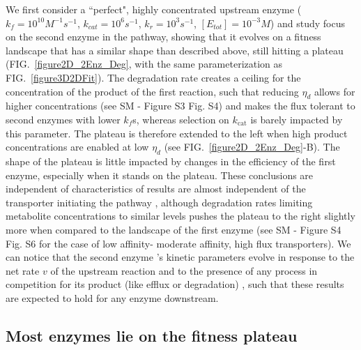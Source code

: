 \documentclass[11pt,onecolumn]{article}
\providecommand{\DIFadd}[1]{{\protect\color{blue} \sf #1}} %
\providecommand{\DIFdel}[1]{{\protect\color{red} \scriptsize #1}} %
\providecommand{\DIFaddbegin}{} %
\providecommand{\DIFaddend}{} %
\providecommand{\DIFdelbegin}{} %
\providecommand{\DIFdelend}{} %
\begin{document}
We first consider a ``perfect", highly concentrated upstream enzyme ($k_f=10^{10}M^{-1}s^{-1}$, $k_{cat}=10^6s^{-1}$, $k_r=10^3s^{-1}$, $[E_{tot}]=10^{-3}M$) and \DIFdelbegin \DIFdel{study }\DIFdelend \DIFaddbegin \DIFadd{focus on }\DIFaddend the second enzyme in the pathway, showing that it evolves on a fitness landscape that has a similar shape than described above, still hitting a plateau (FIG.~\ref{figure2D_2Enz_Deg}, with the same parameterization as FIG.~\ref{figure3D2DFit}). The degradation rate creates a ceiling for the concentration of the product of the first reaction, such that reducing $\eta_{d}$ allows for higher concentrations (see SM \DIFdelbegin \DIFdel{- Figure S3}\DIFdelend \DIFaddbegin \DIFadd{Fig. S4}\DIFaddend ) and makes the flux tolerant to second enzymes with lower $k_f$s, whereas selection on $k_\text{cat}$ is barely impacted by this parameter. The plateau is therefore extended to the left when high product concentrations are enabled at low $\eta_{d}$ (see FIG.~\ref{figure2D_2Enz_Deg}-B). The shape of the plateau is little impacted by changes in the efficiency of the first enzyme, especially when it stands on the plateau. These \DIFdelbegin \DIFdel{conclusions are independent of characteristics of }\DIFdelend \DIFaddbegin \DIFadd{results are almost independent of }\DIFaddend the transporter initiating the pathway 
\DIFdelbegin \DIFdel{, although degradation rates limiting metabolite concentrations to similar levels pushes the plateau to the right slightly more when compared to the landscape of the first enzyme }\DIFdelend (see SM \DIFdelbegin \DIFdel{- Figure S4 }\DIFdelend \DIFaddbegin \DIFadd{Fig. S6 }\DIFaddend for the case of \DIFdelbegin \DIFdel{low affinity- }\DIFdelend \DIFaddbegin \DIFadd{moderate affinity, }\DIFaddend high flux transporters). 
\DIFdelbegin \DIFdel{We can notice that the second enzyme 's kinetic parameters evolve in response to the net rate $v$ of the upstream reaction and to the presence of any process in competition for its product (like efflux or degradation) , such that these results are expected to hold for any enzyme downstream. 
}\DIFdelend 

\DIFdelbegin \subsection{\DIFdel{Most enzymes lie on the fitness plateau}}
\addtocounter{subsection}{-1}%
\end{document}
